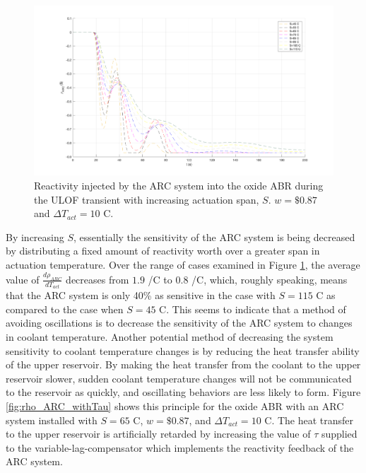 \documentclass[11pt, oneside]{article}   	%
\begin{document}
\begin{figure}[h!]
\includegraphics[width=18cm]{rho_ARC_withS}
\centering
\caption{Reactivity injected by the ARC system into the oxide ABR during the ULOF transient with increasing actuation span, $S$. $w=\$0.87$ and $\Delta T_{act}=10$ C.}
\label{fig:rho_ARC_withS}
\end{figure}

By increasing $S$, essentially the sensitivity of the ARC system is being decreased by distributing a fixed amount of reactivity worth over a greater span in actuation temperature.
Over the range of cases examined in Figure \ref{fig:rho_ARC_withS}, the average value of $\frac{d\rho_{ARC}}{dT_{act}}$ decreases from $1.9$ \cent/C to $0.8$ \cent/C, which, roughly speaking, means that the ARC system is only 40\% as sensitive in the case with $S=115$ C as compared to the case when $S=45$ C.
This seems to indicate that a method of avoiding oscillations is to decrease the sensitivity of the ARC system to changes in coolant temperature.
Another potential method of decreasing the system sensitivity to coolant temperature changes is by reducing the heat transfer ability of the upper reservoir.
By making the heat transfer from the coolant to the upper reservoir slower, sudden coolant temperature changes will not be communicated to the reservoir as quickly, and oscillating behaviors are less likely to form. 
Figure \ref{fig:rho_ARC_withTau} shows this principle for the oxide ABR with an ARC system installed with $S=65$ C, $w=\$0.87$, and $\Delta T_{act} = 10$ C.
The heat transfer to the upper reservoir is artificially retarded by increasing the value of $\tau$ supplied to the variable-lag-compensator which implements the reactivity feedback of the ARC system. 
\end{document}
